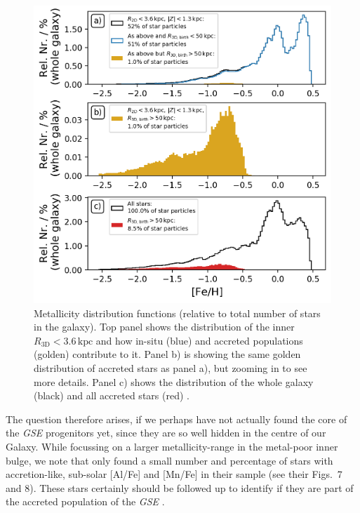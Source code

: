 \documentclass[fleqn,usenatbib]{mnras}
\begin{document}
\begin{figure}
    \centering
    \includegraphics[width=\columnwidth]{figures/fe_h_histogram_inner_galaxy.png}
    \caption{Metallicity distribution functions (relative to total number of stars in the galaxy). Top panel shows the distribution of the inner $R_\mathrm{3D} < 3.6\,\mathrm{kpc}$ and how in-situ (blue) and accreted populations (golden) contribute to it. Panel b) is showing the same golden distribution of accreted stars as panel a), but zooming in to see more details. Panel c) shows the distribution of the whole galaxy (black) and all accreted stars (red) \href{https://github.com/svenbuder/gse_nihaouhd/tree/main/figures}{\faGithub}.}
    \label{fig:fe_h_histogram_inner_galaxy}
\end{figure}

The question therefore arises, if we perhaps have not actually found the core of the \textit{GSE} progenitors yet, since they are so well hidden in the centre of our Galaxy. While focussing on a larger metallicity-range in the metal-poor inner bulge, we note that \citet{Lucey2022} only found a small number and percentage of stars with accretion-like, sub-solar [Al/Fe] and [Mn/Fe] in their sample (see their Figs.~7 and 8). These stars certainly should be followed up to identify if they are part of the accreted population of the \textit{GSE} \citep[see also][]{Kunder2025}.
\end{document}
